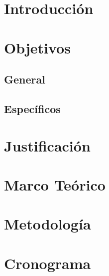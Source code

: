 \vspace{1cm}

\section{Introducción}

\section{Objetivos}
\subsection{General}
\subsection{Específicos}



\section{Justificación}



\section{Marco Teórico}



\section{Metodología}




\section{Cronograma}















